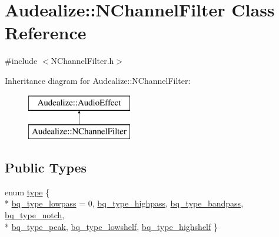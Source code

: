\hypertarget{class_audealize_1_1_n_channel_filter}{}\section{Audealize\+:\+:N\+Channel\+Filter Class Reference}
\label{class_audealize_1_1_n_channel_filter}


{\ttfamily \#include $<$N\+Channel\+Filter.\+h$>$}

Inheritance diagram for Audealize\+:\+:N\+Channel\+Filter\+:\begin{figure}[H]
\begin{center}
\leavevmode
\includegraphics[height=2.000000cm]{class_audealize_1_1_n_channel_filter}
\end{center}
\end{figure}
\subsection*{Public Types}
\begin{DoxyCompactItemize}
\item 
enum \hyperlink{class_audealize_1_1_n_channel_filter_aa3b51c2ea2faf3df7c9b8e55fe96568d}{type} \{ \\*
\hyperlink{class_audealize_1_1_n_channel_filter_aa3b51c2ea2faf3df7c9b8e55fe96568daeea9759fdb6ec40965dc5582ef4b8d07}{bq\+\_\+type\+\_\+lowpass} = 0, 
\hyperlink{class_audealize_1_1_n_channel_filter_aa3b51c2ea2faf3df7c9b8e55fe96568daf2c73c23de5dbf784e796dff2e719505}{bq\+\_\+type\+\_\+highpass}, 
\hyperlink{class_audealize_1_1_n_channel_filter_aa3b51c2ea2faf3df7c9b8e55fe96568dab6181703666febaf3b6ca15c2c342f2f}{bq\+\_\+type\+\_\+bandpass}, 
\hyperlink{class_audealize_1_1_n_channel_filter_aa3b51c2ea2faf3df7c9b8e55fe96568da32cfe8bb5d44261f087ebdd6074debb6}{bq\+\_\+type\+\_\+notch}, 
\\*
\hyperlink{class_audealize_1_1_n_channel_filter_aa3b51c2ea2faf3df7c9b8e55fe96568daed82396d60dff469e7eabb04507cea40}{bq\+\_\+type\+\_\+peak}, 
\hyperlink{class_audealize_1_1_n_channel_filter_aa3b51c2ea2faf3df7c9b8e55fe96568da1def096bd4c43f3b83da70d7520b7fb1}{bq\+\_\+type\+\_\+lowshelf}, 
\hyperlink{class_audealize_1_1_n_channel_filter_aa3b51c2ea2faf3df7c9b8e55fe96568daaa91c04e635b6d257eb8d2ada57e1429}{bq\+\_\+type\+\_\+highshelf}
 \}
\end{DoxyCompactItemize}
